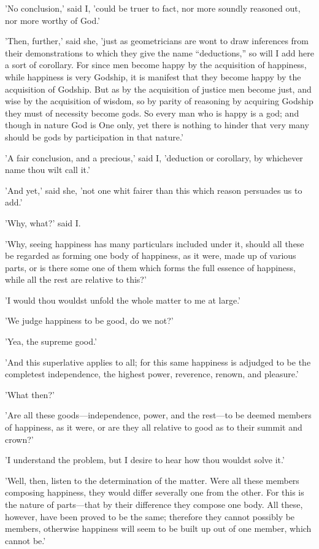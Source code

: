'No conclusion,' said I, 'could be truer to fact, nor more soundly
reasoned out, nor more worthy of God.'

'Then, further,' said she, 'just as geometricians are wont to draw
inferences from their demonstrations to which they give the name
``deductions,'' so will I add here a sort of corollary. For since men
become happy by the acquisition of happiness, while happiness is very
Godship, it is manifest that they become happy by the acquisition of
Godship. But as by the acquisition of justice men become just, and wise
by the acquisition of wisdom, so by parity of reasoning by acquiring
Godship they must of necessity become gods. So every man who is happy is
a god; and though in nature God is One only, yet there is nothing to
hinder that very many should be gods by participation in that nature.'

'A fair conclusion, and a precious,' said I, 'deduction or corollary, by
whichever name thou wilt call it.'

'And yet,' said she, 'not one whit fairer than this which reason
persuades us to add.'

'Why, what?' said I.

'Why, seeing happiness has many particulars included under it, should
all these be regarded as forming one body of happiness, as it were, made
up of various parts, or is there some one of them which forms the full
essence of happiness, while all the rest are relative to this?'

'I would thou wouldst unfold the whole matter to me at large.'

'We judge happiness to be good, do we not?'

'Yea, the supreme good.'

'And this superlative applies to all; for this same happiness is
adjudged to be the completest independence, the highest power,
reverence, renown, and pleasure.'

'What then?'

'Are all these goods—independence, power, and the rest—to be deemed
members of happiness, as it were, or are they all relative to good as to
their summit and crown?'

'I understand the problem, but I desire to hear how thou wouldst solve
it.'

'Well, then, listen to the determination of the matter. Were all these
members composing happiness, they would differ severally one from the
other. For this is the nature of parts—that by their difference they
compose one body. All these, however, have been proved to be the same;
therefore they cannot possibly be members, otherwise happiness will seem
to be built up out of one member, which cannot be.'

